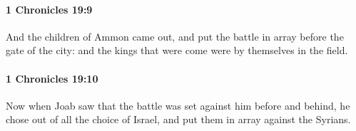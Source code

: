 		\paragraph{1 Chronicles 19:9} %
			\label{1CHRONICLES-19-9}

			And the children of Ammon came out, and put the battle in array before the gate of the city: and the kings that were come were by themselves in the field.


		\paragraph{1 Chronicles 19:10} %
			\label{1CHRONICLES-19-10}

			Now when Joab saw that the battle was set against him before and behind, he chose out of all the choice of Israel, and put them in array against the Syrians.


